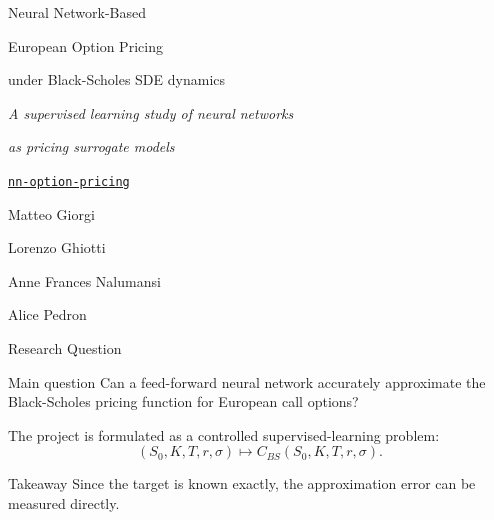 \documentclass[10pt,aspectratio=43]{beamer}
\title{\projecttitle}
\subtitle{\projectsubtitle}
\author{Matteo Giorgi \and Lorenzo Ghiotti \and Anne Frances Nalumansi \and Alice Pedron}
\institute{Machine Learning for Finance}
\date{May 30, 2026}
\newcommand{\projectrepo}{\href{https://github.com/matteogiorgi/nn-option-pricing}{\faGithub\hspace{0.35em}\texttt{nn-option-pricing}}}
\newcommand{\takeaway}[1]{%
    \begin{block}{Takeaway}
        #1
    \end{block}
}
\begin{document}

\begin{frame}[plain]
    \vspace*{0.65cm}
    {\fontsize{25}{30}\selectfont\color{projectviolet} Neural Network-Based\par}
    \vspace{-0.03cm}
    {\fontsize{25}{30}\selectfont\color{projectviolet} European Option Pricing\par}
    \vspace{0.32cm}
    {\Large under Black-Scholes SDE dynamics\par}

    \vspace{0.75cm}
    {\large\itshape A supervised learning study of neural networks\par}
    {\large\itshape as pricing surrogate models\par}
    \vspace{0.35cm}
    {\footnotesize\color{projectorange}\projectrepo\par}

    \vfill
    \hfill
    \begin{minipage}{0.42\linewidth}
        \raggedleft
        \small
        Matteo Giorgi\par
        Lorenzo Ghiotti\par
        Anne Frances Nalumansi\par
        Alice Pedron\par
    \end{minipage}
\end{frame}


\begin{frame}{Research Question}
    \begin{block}{Main question}
        Can a feed-forward neural network accurately approximate the Black-Scholes pricing function for European call options?
    \end{block}

    The project is formulated as a controlled supervised-learning problem:
    \[
        (S_0, K, T, r, \sigma)
        \longmapsto
        C_{BS}(S_0,K,T,r,\sigma).
    \]

    \takeaway{Since the target is known exactly, the approximation error can be measured directly.}
\end{frame}
\end{document}
